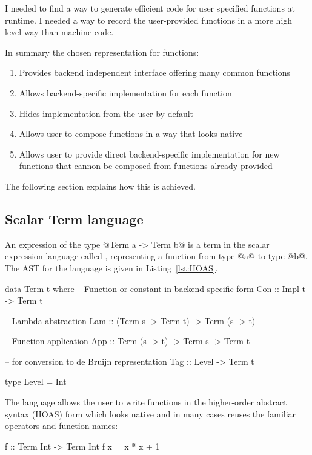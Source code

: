 \documentclass[preamble.tex]{subfiles}
\begin{document}
I needed to find a way to generate efficient code for user specified functions at runtime. I needed a way to record the user-provided functions in a more high level way than machine code.

In summary the chosen representation for functions:
\begin{enumerate}
\halfspacing
\item Provides backend independent interface offering many common functions
\item Allows backend-specific implementation for each function
\item Hides implementation from the user by default
\item Allows user to compose functions in a way that looks native
\item Allows user to provide direct backend-specific implementation for new functions that cannon be composed from functions already provided
\end{enumerate}

The following section explains how this is achieved.


\subsection{Scalar Term language}

An expression of the type @Term a -> Term b@ is a term in the scalar expression language called , representing a function from type @a@ to type @b@. The AST for the  language is given in Listing~\ref{lst:HOAS}.

\begin{hscode2}[%
    caption={Term language for HOAS representation.},%
    label=lst:HOAS,%
]
data Term t where
  -- Function or constant in backend-specific form
  Con :: Impl t -> Term t

  -- Lambda abstraction
  Lam :: (Term s -> Term t) -> Term (s -> t)

  -- Function application
  App :: Term (s -> t) -> Term s -> Term t

  -- for conversion to de Bruijn representation
  Tag :: Level -> Term t

type Level = Int
\end{hscode2}

The language allows the user to write functions in the higher-order abstract syntax (HOAS) form which looks native and in many cases reuses the familiar operators and function names:

\begin{hscode}
f :: Term Int -> Term Int
f x = x * x + 1
\end{hscode}
\end{document}
